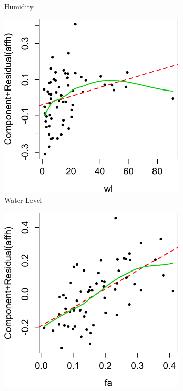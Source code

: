 \documentclass[preprint,review,12pt]{elsarticle}
\begin{document}
\begin{figure}[!htp]
\begin{subfigure}[t]{0.23\textwidth}
\caption{Humidity}
\end{subfigure}
\begin{subfigure}[t]{0.23\textwidth}
\centering
\includegraphics[width=\linewidth, keepaspectratio]{wl.pdf}
\caption{Water Level}
\end{subfigure}
\begin{subfigure}[t]{0.23\textwidth}
\centering
\includegraphics[width=\linewidth, keepaspectratio]{fa.pdf}

\end{subfigure}
\end{figure}
\end{document}
